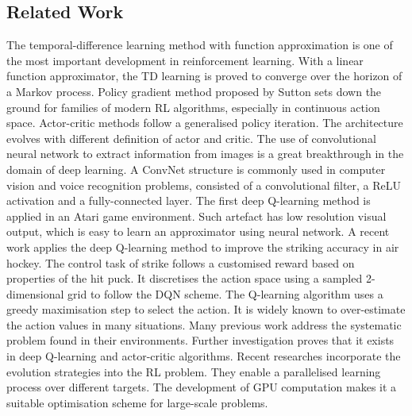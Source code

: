\documentclass[oneside,11pt,a4paper]{article}
\begin{document}
\subsection{Related Work}
The temporal-difference learning method with function approximation is one of the most important development in reinforcement learning. With a linear function approximator, the TD learning is proved to converge over the horizon of a Markov process. Policy gradient method proposed by Sutton sets down the ground for families of modern RL algorithms, especially in continuous action space. Actor-critic methods follow a generalised policy iteration. The architecture evolves with different definition of actor and critic.
\newline
\newline
\noindent
The use of convolutional neural network to extract information from images is a great breakthrough in the domain of deep learning. A ConvNet structure is commonly used in computer vision and voice recognition problems, consisted of a convolutional filter, a ReLU activation and a fully-connected layer. The first deep Q-learning method is applied in an Atari game environment. Such artefact has low resolution visual output, which is easy to learn an approximator using neural network.
\newline
\newline
\noindent
A recent work applies the deep Q-learning method to improve the striking accuracy in air hockey. The control task of strike follows a customised reward based on properties of the hit puck. It discretises the action space using a sampled 2-dimensional grid to follow the DQN scheme.
\newline
\newline
\noindent
The Q-learning algorithm uses a greedy maximisation step to select the action. It is widely known to over-estimate the action values in many situations. Many previous work address the systematic problem found in their environments. Further investigation proves that it exists in deep Q-learning and actor-critic algorithms.
\newline
\newline
\noindent
Recent researches incorporate the evolution strategies into the RL problem. They enable a parallelised learning process over different targets. The development of GPU computation makes it a suitable optimisation scheme for large-scale problems.
\newline
\newline
\noindent
\end{document}

